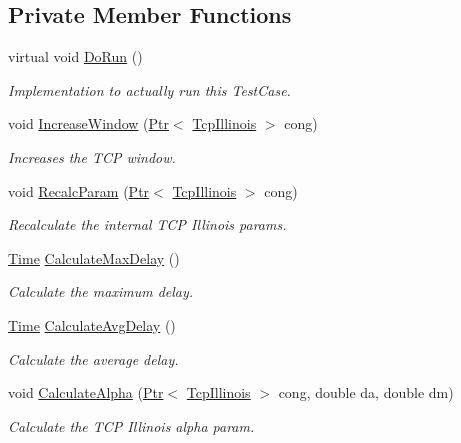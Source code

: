\subsection*{Private Member Functions}
\begin{DoxyCompactItemize}
\item 
virtual void \hyperlink{classTcpIllinoisTest_a496fabd3bdc6378fda2a552d7cc202c9}{Do\+Run} ()
\begin{DoxyCompactList}\small\item\em Implementation to actually run this Test\+Case. \end{DoxyCompactList}\item 
void \hyperlink{classTcpIllinoisTest_a4c31729e231aa7652ce8e221f8004d5a}{Increase\+Window} (\hyperlink{classns3_1_1Ptr}{Ptr}$<$ \hyperlink{classns3_1_1TcpIllinois}{Tcp\+Illinois} $>$ cong)
\begin{DoxyCompactList}\small\item\em Increases the T\+CP window. \end{DoxyCompactList}\item 
void \hyperlink{classTcpIllinoisTest_a3f3db45f9efc88dd60146c6f3dd02be0}{Recalc\+Param} (\hyperlink{classns3_1_1Ptr}{Ptr}$<$ \hyperlink{classns3_1_1TcpIllinois}{Tcp\+Illinois} $>$ cong)
\begin{DoxyCompactList}\small\item\em Recalculate the internal T\+CP Illinois params. \end{DoxyCompactList}\item 
\hyperlink{classns3_1_1Time}{Time} \hyperlink{classTcpIllinoisTest_a18563a2afdc122d52e5830704cb43f91}{Calculate\+Max\+Delay} ()
\begin{DoxyCompactList}\small\item\em Calculate the maximum delay. \end{DoxyCompactList}\item 
\hyperlink{classns3_1_1Time}{Time} \hyperlink{classTcpIllinoisTest_a028852f10ed6ca5a1909294132a5e965}{Calculate\+Avg\+Delay} ()
\begin{DoxyCompactList}\small\item\em Calculate the average delay. \end{DoxyCompactList}\item 
void \hyperlink{classTcpIllinoisTest_a268dc2c39fcfc617ad967b5762e4f235}{Calculate\+Alpha} (\hyperlink{classns3_1_1Ptr}{Ptr}$<$ \hyperlink{classns3_1_1TcpIllinois}{Tcp\+Illinois} $>$ cong, double da, double dm)
\begin{DoxyCompactList}\small\item\em Calculate the T\+CP Illinois alpha param. \end{DoxyCompactList}\item 

\end{DoxyCompactItemize}
